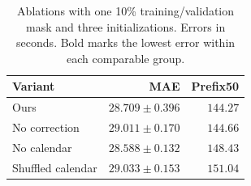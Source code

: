 \begin{table}[t]
\centering\footnotesize\setlength{\tabcolsep}{4pt}
\caption{Ablations with one 10\% training/validation mask and three initializations. Errors in seconds. Bold marks the lowest error within each comparable group.}\label{tab:finite_ablation}
\begin{tabular}{lrr}\toprule
Variant & MAE & Prefix50\\\midrule
Ours & $28.709\pm0.396$ & $\mathbf{144.27}$\\
No correction & $29.011\pm0.170$ & $144.66$\\
No calendar & $\mathbf{28.588\pm0.132}$ & $148.43$\\
Shuffled calendar & $29.033\pm0.153$ & $151.04$\\
\bottomrule\end{tabular}
\end{table}
